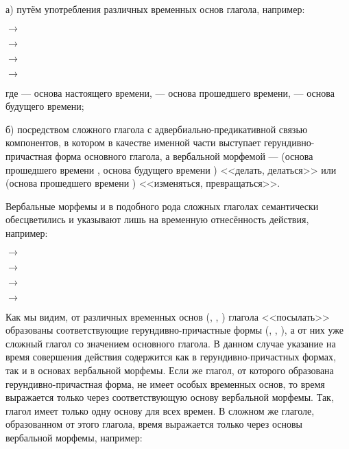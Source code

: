 а) путём употребления различных временных основ глагола, например:
\begin{prfsample}
	\item {} $\rightarrow$
	\item \quad$\rightarrow$ 
	\item \quad$\rightarrow$ 
	\item \quad$\rightarrow$ 
\end{prfsample}
где  --- основа настоящего времени,  --- основа прошедшего времени,  --- основа будущего времени;

б) посредством сложного глагола с адвербиально-предикативной связью компонентов, в котором в качестве именной части выступает герундивно-причастная форма основного
глагола, а вербальной морфемой ---  (основа прошедшего времени , основа будущего времени ) <<делать, делаться>> или  (основа прошедшего времени ) <<изменяться, превращаться>>.

Вербальные морфемы  и  в подобного рода сложных глаголах семантически обесцветились и указывают лишь на временную отнесённость действия, например:
\begin{prfsample}
	\item {} $\rightarrow$
	\item \quad$\rightarrow$ 
	\item \quad$\rightarrow$ 
	\item \quad$\rightarrow$ 
\end{prfsample}

Как мы видим, от различных временных основ (, , ) глагола <<посылать>> образованы соответствующие герундивно-причастные формы (, , ), а от них уже сложный глагол со значением основного глагола. В данном случае указание на время совершения действия содержится как в герундивно-причастных формах, так и в основах вербальной морфемы. Если же глагол, от которого образована герундивно-причастная форма, не имеет особых временных основ, то время выражается только через соответствующую основу вербальной морфемы. Так, глагол
 имеет только одну основу для всех времен. В сложном же глаголе, образованном от этого глагола, время выражается только через основы вербальной морфемы, например:


